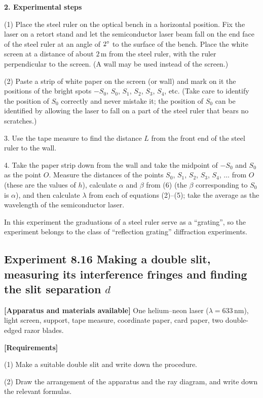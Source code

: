 \textbf{2. Experimental steps}

(1) Place the steel ruler on the optical bench in a horizontal position. Fix the laser on a retort stand and let the semiconductor laser beam fall on the end face of the steel ruler at an angle of $2^{\circ}$ to the surface of the bench. Place the white screen at a distance of about $2\,\mathrm{m}$ from the steel ruler, with the ruler perpendicular to the screen. (A wall may be used instead of the screen.)

(2) Paste a strip of white paper on the screen (or wall) and mark on it the positions of the bright spots $-S_0$, $S_0$, $S_1$, $S_2$, $S_3$, $S_4$, etc. (Take care to identify the position of $S_0$ correctly and never mistake it; the position of $S_0$ can be identified by allowing the laser to fall on a part of the steel ruler that bears no scratches.)

3. Use the tape measure to find the distance $L$ from the front end of the steel ruler to the wall.

4. Take the paper strip down from the wall and take the midpoint of $-S_0$ and $S_0$ as the point $O$. Measure the distances of the points $S_0$, $S_1$, $S_2$, $S_3$, $S_4$, $\ldots$ from $O$ (these are the values of $h$), calculate $\alpha$ and $\beta$ from (6) (the $\beta$ corresponding to $S_0$ is $\alpha$), and then calculate $\lambda$ from each of equations (2)--(5); take the average as the wavelength of the semiconductor laser.

\begin{commentary}
In this experiment the graduations of a steel ruler serve as a ``grating'', so the experiment belongs to the class of ``reflection grating'' diffraction experiments.
\end{commentary}

\subsection*{Experiment 8.16 \quad Making a double slit, measuring its interference fringes and finding the slit separation $d$}

\textbf{[Apparatus and materials available]} One helium--neon laser ($\lambda=633\,\mathrm{nm}$), light screen, support, tape measure, coordinate paper, card paper, two double-edged razor blades.

\textbf{[Requirements]}

(1) Make a suitable double slit and write down the procedure.

(2) Draw the arrangement of the apparatus and the ray diagram, and write down the relevant formulas.


